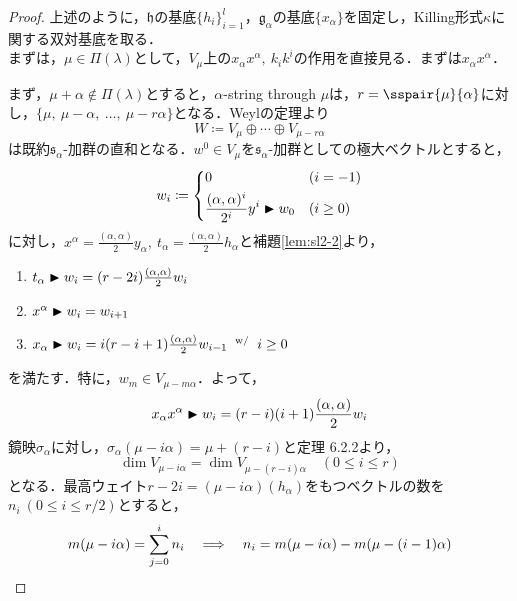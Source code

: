 \documentclass[rep_main]{subfiles}
\begin{document}
\begin{proof}
	上述のように，$\mathfrak{h}$の基底$\{h_i\}_{i=1}^l$，$\mathfrak{g}_\alpha$の基底$\{x_\alpha\}$を固定し，Killing形式$\kappa$に関する双対基底を取る．\\
	まずは，$\mu \in \Pi(\lambda)$として，$V_\mu$上の$x_\alpha x^\alpha,\ k_ik^i$の作用を直接見る．まずは$x_\alpha x^\alpha$．
	
	まず，$\mu + \alpha \notin \Pi(\lambda)$とすると，$\alpha$-string through $\mu$は，$r = \sspair{\mu}{\alpha}$に対し，$\{\mu,\ \mu - \alpha,\ \ldots,\ \mu - r\alpha\}$となる．Weylの定理より
	\begin{equation}
		W \coloneqq V_\mu \oplus \cdots \oplus V_{\mu - r\alpha}
	\end{equation}
	は既約$\mathfrak{s}_\alpha$-加群の直和となる．$w^0 \in V_\mu$を$\mathfrak{s}_\alpha$-加群としての極大ベクトルとすると，
	\begin{equation}
		w_i \coloneqq \left\{\begin{aligned}
			 &0 &&(i = -1) \\
			 &\frac{(\alpha, \alpha)^i}{2^i}y^i \blacktriangleright w_0  &&(i \geq 0)
		\end{aligned} \right.
	\end{equation}
	に対し，$x^\alpha = \frac{(\alpha, \alpha)}{2}y_\alpha,\ t_\alpha = \frac{(\alpha, \alpha)}{2}h_\alpha$と補題\ref{lem:sl2-2}より，
	\begin{enumerate}
		\item $t_\alpha \blacktriangleright w_i = (r - 2i)\frac{(\alpha, \alpha)}{2}w_i$
		\item $x^\alpha \blacktriangleright w_i = w_{i+1}$
		\item $x_\alpha \blacktriangleright w_i = i(r - i+1)\frac{(\alpha, \alpha)}{2}w_{i-1}  \mathrel{} {}^{\mathrm{w}/} \mathrel{} i \ge 0$
	\end{enumerate}
	を満たす．特に，$w_m \in V_{\mu - m\alpha}$．よって，
	\begin{equation}
		\label{eq:Freudenthal-proof-1}
		x_\alpha x^\alpha \blacktriangleright w_i = (r - i)(i + 1)\frac{(\alpha, \alpha)}{2}w_i
	\end{equation}
	鏡映$\sigma_\alpha$に対し，$\sigma_\alpha(\mu - i\alpha) = \mu + (r - i)$と定理 6.2.2より，
	\begin{equation}
		\dim V_{\mu - i\alpha} = \dim V_{\mu - (r - i)\alpha}\quad  (0 \leq i \leq r)
	\end{equation}
	となる．最高ウェイト$r - 2i = (\mu - i\alpha)(h_\alpha)$をもつベクトルの数を$n_i\ (0 \leq i \leq r/2)$とすると，
	\begin{equation}
		m(\mu - i\alpha) = \sum_{j = 0}^i n_i  \IMP  n_i = m(\mu - i\alpha) - m(\mu - (i - 1)\alpha)

\end{equation}
\end{proof}
\end{document}
